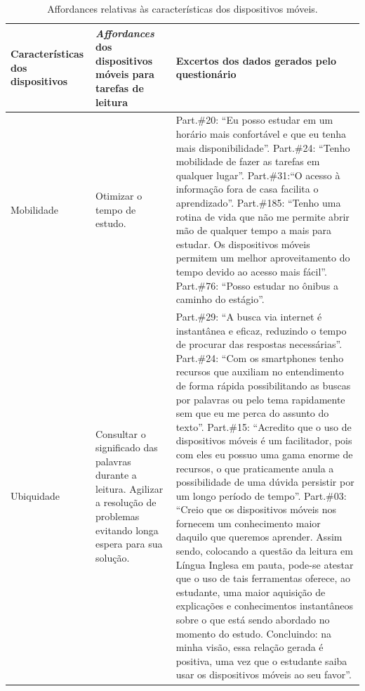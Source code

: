 \documentclass[portuguese]{textolivre}
\begin{document}
\begin{table}[h!]
\small
\centering
\begin{threeparttable}
\caption{Affordances relativas às características dos dispositivos móveis.}
\label{tab02}
\begin{tabular}{lp{3cm}p{7.5cm}}
\toprule
\multicolumn{1}{p{3cm}}{Características dos dispositivos} & \emph{Affordances} dos dispositivos móveis para tarefas de leitura & Excertos dos dados gerados pelo questionário \\
\midrule
Mobilidade & Otimizar o tempo de estudo. & 
Part.\#20: “Eu posso estudar em um horário mais confortável e que eu tenha mais disponibilidade”. \newline 
Part.\#24: “Tenho  mobilidade de fazer as tarefas em qualquer lugar”.\newline  
Part.\#31:“O acesso à informação fora de casa facilita o aprendizado”.\newline
Part.\#185: “Tenho uma rotina de vida que não me permite abrir mão de qualquer tempo a mais para estudar. Os dispositivos móveis permitem um melhor aproveitamento do tempo devido ao acesso mais fácil”.\newline
Part.\#76: “Posso estudar no ônibus a caminho do estágio”. \\

Ubiquidade & Consultar o significado das palavras durante a leitura. \newline
Agilizar a resolução de problemas evitando longa espera para sua solução. & 
Part.\#29: “A busca via internet é instantânea e eficaz, reduzindo o tempo de procurar das respostas necessárias”.\newline
Part.\#24: “Com os smartphones tenho recursos que auxiliam no entendimento de forma rápida possibilitando as buscas por palavras ou pelo 	tema rapidamente sem que eu me perca do assunto do texto”. \newline  
Part.\#15: “Acredito que o uso de dispositivos móveis é um facilitador, pois com eles eu possuo uma gama enorme de recursos, o que praticamente anula a possibilidade de uma dúvida persistir por um longo período de tempo”. \newline 
Part.\#03: “Creio que os dispositivos móveis nos fornecem um conhecimento maior daquilo que queremos aprender. Assim sendo, colocando a questão da leitura em Língua Inglesa em pauta, pode-se atestar que o uso de tais ferramentas oferece, ao estudante, uma maior aquisição de explicações e conhecimentos instantâneos sobre o que está sendo abordado no momento do estudo. Concluindo: na minha visão, essa relação gerada é positiva, uma vez que o estudante saiba usar os dispositivos móveis ao seu favor”.  \\
\bottomrule
\end{tabular}
\end{threeparttable}
\end{table}
\end{document}

